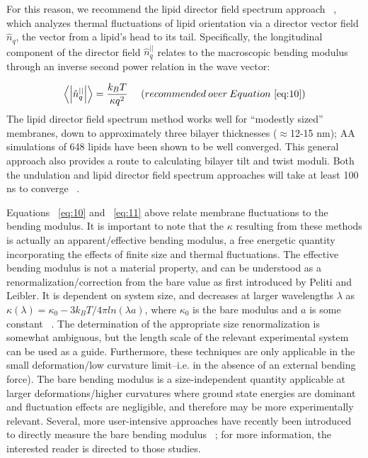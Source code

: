 \documentclass[9pt,bestpractices,pubversion]{livecoms}
\begin{document}
For this reason, we recommend the lipid director field spectrum approach ~\cite{Watson2012a,Venable2015}, which analyzes thermal fluctuations of lipid orientation via a director vector field $\hat{n}_q$, the vector from a lipid's head to its tail.
Specifically, the longitudinal component of the director field $\hat{n}_q^{||}$ relates to the macroscopic bending modulus through an inverse second power relation in the wave vector:

\begin{equation}\label{eq:11}
	\left< \left|\hat{n}_q^{||} \right| \right> = \frac{k_BT}{\kappa q^2}\ \quad (recommended \: over \: Equation~\ref{eq:10})
\end{equation}
The lipid director field spectrum method works well for ``modestly sized'' membranes, down to approximately three bilayer thicknesses ($\approx$12-15 nm); AA simulations of 648 lipids have been shown to be well converged.
This general approach also provides a route to calculating bilayer tilt and twist moduli.
Both the undulation and lipid director field spectrum approaches will take at least 100 ns to converge  ~\cite{Venable2015}.

Equations ~\ref{eq:10} and ~\ref{eq:11} above relate membrane fluctuations to the bending modulus.
It is important to note that the $\kappa$ resulting from these methods is actually an apparent/effective bending modulus, a free energetic quantity incorporating the effects of finite size and thermal fluctuations.
The effective bending modulus is not a material property, and can be understood as a renormalization/correction from the bare value as first introduced by Peliti and Leibler.
It is dependent on system size, and decreases at larger wavelengths $\lambda$ as $\kappa(\lambda) = \kappa _0 - 3k_BT/4\pi ln(\lambda a)$, where $\kappa_0$ is the bare modulus and $a$ is some constant  ~\cite{Peliti1985}.
The determination of the appropriate size renormalization is somewhat ambiguous, but the length scale of the relevant experimental system can be used as a guide.
Furthermore, these techniques are only applicable in the small deformation/low curvature limit--i.e. in the absence of an external bending force).
The bare bending modulus is a size-independent quantity applicable at larger deformations/higher curvatures where ground state energies are dominant and fluctuation effects are negligible, and therefore may be more experimentally relevant.
Several, more user-intensive approaches have recently been introduced to directly measure the bare bending modulus ~\cite{Diggins2013,Hu2012a,Harmandaris2006a,DenOtter2003}; for more information, the interested reader is directed to those studies.
\end{document}

